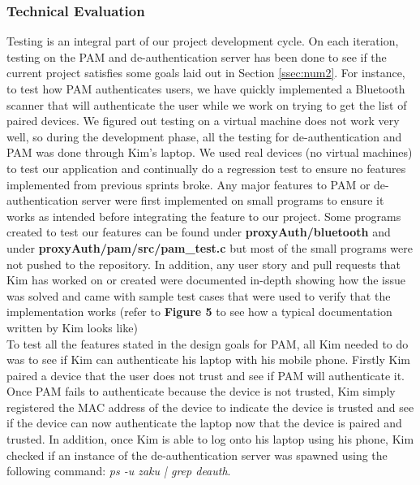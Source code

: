 \documentclass[letterpaper,twocolumn,10pt]{article}
\begin{document}
{{\subsubsection{Technical Evaluation}
Testing is an integral part of our project development cycle. On each iteration, testing on the PAM and de-authentication server has been done to see if the current project satisfies some goals laid out in Section \ref{ssec:num2}. For instance, to test how PAM authenticates users, we have quickly implemented a Bluetooth scanner that will authenticate the user while we work on trying to get the list of paired devices. We figured out testing on a virtual machine does not work very well, so during the development phase, all the testing for de-authentication and PAM was done through Kim's laptop. We used real devices (no virtual machines) to test our application and continually do a regression test to ensure no features implemented from previous sprints broke. Any major features to PAM or de-authentication server were first implemented on small programs to ensure it works as intended before integrating the feature to our project. Some programs created to test our features can be found under \textbf{proxyAuth/bluetooth} and under \textbf{proxyAuth/pam/src/pam\_test.c} but most of the small programs were not pushed to the repository. In addition, any user story and pull requests that Kim has worked on or created were documented in-depth showing how the issue was solved and came with sample test cases that were used to verify that the implementation works (refer to \textbf{Figure 5} to see how a typical documentation written by Kim looks like)\\

To test all the features stated in the design goals for PAM, all Kim needed to do was to see if Kim can authenticate his laptop with his mobile phone. Firstly Kim paired a device that the user does not trust and see if PAM will authenticate it. Once PAM fails to authenticate because the device is not trusted, Kim simply registered the MAC address of the device to indicate the device is trusted and see if the device can now authenticate the laptop now that the device is paired and trusted. In addition, once Kim is able to log onto his laptop using his phone, Kim checked if an instance of the de-authentication server was spawned using the following command: \emph{ps -u zaku | grep deauth}.

}}
\end{document}
